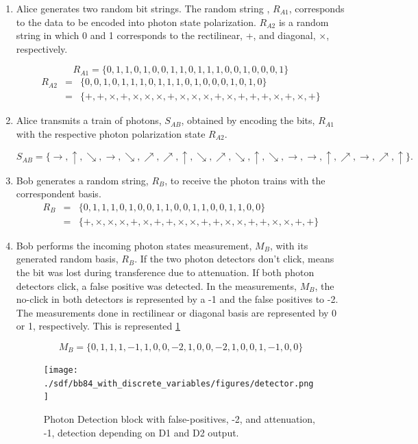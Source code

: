 \begin{enumerate}
	\item Alice generates two random bit strings. The random string , $R_{A1}$, corresponds to the data to be encoded into photon state polarization. $R_{A2}$ is a random string in which 0 and 1 corresponds to the rectilinear, +, and diagonal, $\times$, respectively.
	
	$$ R_{A1} = \{0,1,1,0,1,0,0,1,1,0,1,1,1,0,0,1,0,0,0,1\}$$
	\begin{eqnarray}
		R_{A2} &=& \{0,0,1,0,1,1,1,0,1,1,1,0,1,0,0,0,1,0,1,0\} \nonumber \\
		&=& \{+,+,\times,+,\times, \times, \times, +,\times, \times, \times,+,\times,+,+,+,\times,+,\times,+\}\nonumber
	\end{eqnarray}
	
	\item Alice transmits a train of photons, $S_{AB}$, obtained by encoding the bits, $R_{A1}$ with the respective photon polarization state $R_{A2}$.
	
	$$S_{AB} = \{\to, \uparrow, \searrow, \to, \searrow, \nearrow, \nearrow, \uparrow, \searrow, \nearrow, \searrow, \uparrow, \searrow, \to, \to, \uparrow, \nearrow, \to, \nearrow, \uparrow\}.$$
	
	\item Bob generates a random string, $R_{B}$, to receive the photon trains with the correspondent basis.
	\begin{eqnarray}
		R_{B} &=& \{0,1,1,1,0,1,0,0,1,1,0,0,1,1,0,0,1,1,0,0\} \nonumber\\
		&=&\{+,\times,\times,\times,+,\times,+,+,\times,\times,+,+,\times,\times,+,+,\times,\times,+,+\} \nonumber
	\end{eqnarray}
	
	\item Bob performs the incoming photon states measurement, $M_{B}$, with its generated random basis, $R_{B}$. If the two photon detectors don't click, means the bit was lost during transference due to attenuation. If both photon detectors click, a false positive was detected. In the measurements, $M_{B}$, the no-click in both detectors is represented by a -1 and the false positives to -2. The measurements done in rectilinear or diagonal basis are represented by 0 or 1, respectively. This is represented \ref{fig:bb84 detector}
	
	$$M_{B} = \{0,1,1,1,-1,1,0,0,-2,1,0,0,-2,1,0,0,1,-1,0,0\}$$	

	\begin{figure}[H]
		\centering
		\texttt{[image: ./sdf/bb84\_with\_discrete\_variables/figures/detector.png]}
		\caption{Photon Detection block with false-positives, -2, and attenuation, -1, detection depending on D1 and D2 output.\label{fig:bb84 detector}}
	\end{figure}
	

\end{enumerate}
